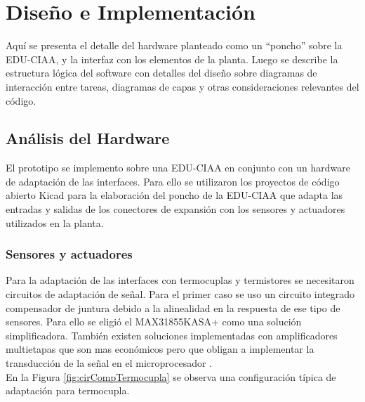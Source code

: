 \chapter{Diseño e Implementación} %
\label{Chapter3} %
Aquí se presenta el detalle del hardware planteado como un \enquote{poncho} sobre la EDU-CIAA, y la interfaz con los elementos de la planta. Luego se describe la estructura lógica del software con detalles del diseño sobre diagramas de interacción entre tareas, diagramas de capas y otras consideraciones relevantes del código.


\section{Análisis del Hardware}
\label{analisis_hardware}
El prototipo se implemento sobre una EDU-CIAA en conjunto con un hardware de adaptación de las interfaces. Para ello se utilizaron los proyectos de código abierto Kicad \citep{kicad} para la elaboración del poncho de la EDU-CIAA \citep{brengiponchos} que adapta las entradas y salidas de los conectores de expansión con los sensores y actuadores utilizados en la planta. 

\subsection{ Sensores y actuadores }


Para la adaptación de las interfaces con termocuplas y termistores se necesitaron circuitos de adaptación de señal. Para el primer caso se uso un circuito integrado compensador de juntura debido a la alinealidad en la respuesta de ese tipo de sensores. Para ello se eligió el MAX31855KASA+ \footnotemark como una solución simplificadora. 
También existen soluciones implementadas con amplificadores multietapas que son mas económicos pero que obligan a implementar la transducción de la señal en el microprocesador \citep{interOpamp}.\\
En la Figura \ref{fig:cirCompTermocupla} se observa una configuración típica de adaptación para termocupla.


